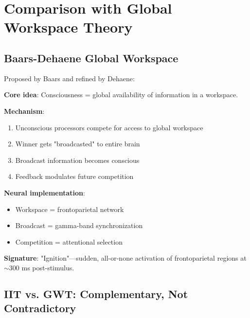 \section{Comparison with Global Workspace Theory}

\subsection{Baars-Dehaene Global Workspace}

\begin{defn}\label{def:gwt}
Proposed by Baars\cite{baars1988} and refined by Dehaene\cite{dehaene2001}:

\textbf{Core idea}: Consciousness = global availability of information in a workspace.

\textbf{Mechanism}:
\begin{enumerate}
\item Unconscious processors compete for access to global workspace
\item Winner gets "broadcasted" to entire brain
\item Broadcast information becomes conscious
\item Feedback modulates future competition
\end{enumerate}

\textbf{Neural implementation}:
\begin{itemize}
\item Workspace = frontoparietal network
\item Broadcast = gamma-band synchronization
\item Competition = attentional selection
\end{itemize}

\textbf{Signature}: "Ignition"—sudden, all-or-none activation of frontoparietal regions at $\sim$300 ms post-stimulus\cite{del2014}.
\end{defn}

\subsection{IIT vs. GWT: Complementary, Not Contradictory}

